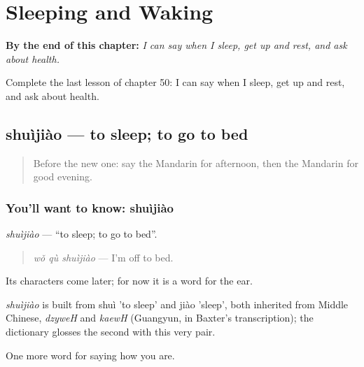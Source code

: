 
\chapter{Sleeping and Waking}
\label{ch:zh-sleeping-and-waking}

\begin{chapteropening}
\textbf{By the end of this chapter:} \emph{I can say when I sleep, get up and rest, and ask about health.}

Complete the last lesson of chapter 50: I can say when I sleep, get up and rest, and ask about health.
\end{chapteropening}

\section[shuìjiào]{shuìjiào — to sleep; to go to bed}

\label{lesson:ZH-C50-shuijiao}



\begin{quote}
Before the new one: say the Mandarin for afternoon, then the Mandarin for good evening.
\end{quote}

\subsection*{You'll want to know: shuìjiào}
\emph{shuìjiào} — \textquotedblleft{}to sleep; to go to bed\textquotedblright{}.

\begin{quote}
\emph{wǒ qù shuìjiào} — I'm off to bed.
\end{quote}

Its characters come later; for now it is a word for the ear.

\begin{cousinweb}
\emph{shuìjiào} is built from shuì 'to sleep' and jiào 'sleep', both inherited from Middle Chinese, \emph{dzyweH} and \emph{kaewH} (Guangyun, in Baxter's transcription); the dictionary glosses the second with this very pair.
\end{cousinweb}

\begin{grammarlens}[title={What you've built}]
One more word for saying how you are.
\end{grammarlens}

